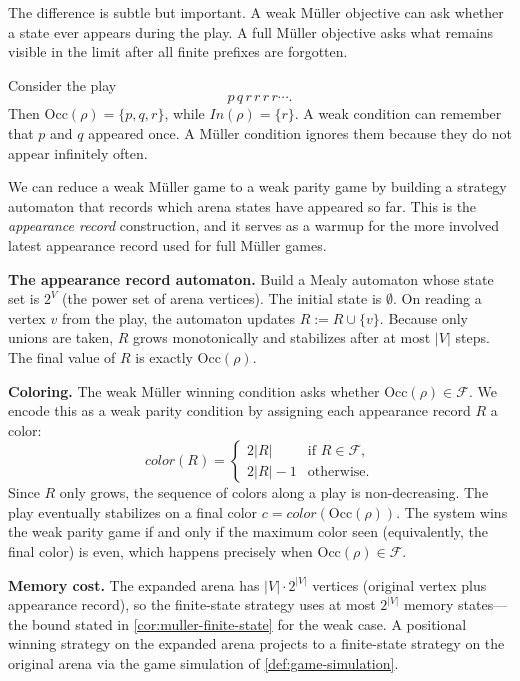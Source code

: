 The difference is subtle but important.  A weak M\"uller objective can
ask whether a state ever appears during the play.  A full M\"uller
objective asks what remains visible in the limit after all finite
prefixes are forgotten.

\begin{example}
\label{ex:occ-vs-inf}
Consider the play
\[
  p\,q\,r\,r\,r\,r\cdots.
\]
Then $\mathrm{Occ}(\rho)=\{p,q,r\}$, while
$In(\rho)=\{r\}$.  A weak condition can remember that $p$ and $q$
appeared once.  A M\"uller condition ignores them because they do not
appear infinitely often.
\end{example}

\begin{formaldetails}
\label{formal:weak-muller-to-parity}
We can reduce a weak M\"uller game to a weak parity game by building a
strategy automaton that records which arena states have appeared so far.
This is the \emph{appearance record} construction, and it serves as a
warmup for the more involved latest appearance record used for full
M\"uller games.

\medskip\noindent\textbf{The appearance record automaton.}
Build a Mealy automaton whose state set is $2^V$ (the power set of arena
vertices).  The initial state is $\emptyset$.  On reading a vertex $v$
from the play, the automaton updates $R:=R\cup\{v\}$.  Because only
unions are taken, $R$ grows monotonically and stabilizes after at most
$|V|$ steps.  The final value of $R$ is exactly $\mathrm{Occ}(\rho)$.

\medskip\noindent\textbf{Coloring.}
The weak M\"uller winning condition asks whether $\mathrm{Occ}(\rho)
\in\mathcal{F}$.  We encode this as a weak parity condition by
assigning each appearance record $R$ a color:
\[
  \textit{color}(R)=
  \begin{cases}
    2|R|   & \text{if } R\in\mathcal{F}, \\
    2|R|-1 & \text{otherwise}.
  \end{cases}
\]
Since $R$ only grows, the sequence of colors along a play is
non-decreasing.  The play eventually stabilizes on a final color
$c=\textit{color}(\mathrm{Occ}(\rho))$.  The system wins the weak
parity game if and only if the maximum color seen (equivalently, the
final color) is even, which happens precisely when
$\mathrm{Occ}(\rho)\in\mathcal{F}$.

\medskip\noindent\textbf{Memory cost.}
The expanded arena has $|V|\cdot 2^{|V|}$ vertices (original vertex plus
appearance record), so the finite-state strategy uses at most $2^{|V|}$
memory states---the bound stated in \cref{cor:muller-finite-state} for
the weak case.  A positional winning strategy on the expanded arena
projects to a finite-state strategy on the original arena via the game
simulation of \cref{def:game-simulation}.
\end{formaldetails}


